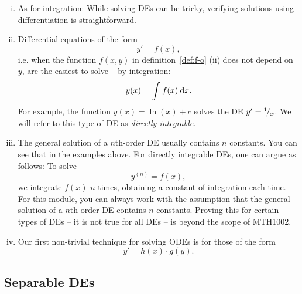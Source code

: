 \begin{remark}
\label{rem:first_de_rems}	
\begin{enumerate}[(i)]
	\item As for integration: While solving DEs can be tricky, verifying solutions using differentiation is straightforward.
	\item Differential equations of the form
	\[ y'=f(x), \]
	i.e. when the function $f(x,y)$ in definition~\ref{def:f-o} (ii) does not depend on $y$, are the easiest to solve -- by integration:
	\[ y(x) = \int_{}^{} f(x) \: \mathrm{d} x. \]
	For example, the function $y(x)=\ln(x)+c$ solves the DE $y'={}^{1}\!/_{x}$. We will refer to this type of DE as \emph{directly integrable}.
	\item The general solution of a $n$th-order DE usually contains $n$ constants. You can see that in the examples above. For directly integrable DEs, one can argue as follows: To solve
	\[ y^{(n)}=f(x), \]
	we integrate $f(x)$ $n$ times, obtaining a constant of integration each time. For this module, you can always work with the assumption that the general solution of a $n$th-order DE contains $n$ constants. Proving this for certain types of DEs -- it is not true for all DEs -- is beyond the scope of MTH1002.
	\item Our first non-trivial technique for solving ODEs is for those of the form
	\[ y'=h(x) \cdot g(y). \]
\end{enumerate}
\end{remark}

\subsection{Separable DEs}

